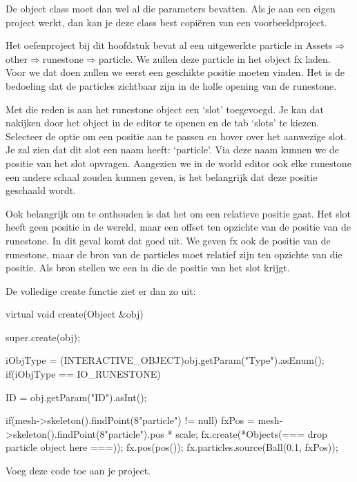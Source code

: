 \begin{note}
De object class  moet dan wel al die parameters bevatten. Als je aan een eigen project werkt, dan kan je deze class best copi\"eren van een voorbeeldproject. 
\end{note}

Het oefenproject bij dit hoofdstuk bevat al een uitgewerkte particle in Assets$\Rightarrow$other$\Rightarrow$runestone$\Rightarrow$particle. We zullen deze particle in het object fx laden. Voor we dat doen zullen we eerst een geschikte positie moeten vinden. Het is de bedoeling dat de particles zichtbaar zijn in de holle opening van de runestone. 

Met die reden is aan het runestone object een `slot' toegevoegd. Je kan dat nakijken door het object in de editor te openen en de tab `slots' te kiezen. Selecteer de optie om een positie aan te passen en hover over het aanwezige slot. Je zal zien dat dit slot een naam heeft: `particle'. Via deze naam kunnen we de positie van het slot opvragen. Aangezien we in de world editor ook elke runestone een andere schaal zouden kunnen geven, is het belangrijk dat deze positie geschaald wordt.

Ook belangrijk om te onthouden is dat het om een relatieve positie gaat. Het slot heeft geen positie in de wereld, maar een offset ten opzichte van de positie van de runestone. In dit geval komt dat goed uit. We geven fx ook de positie van de runestone, maar de bron van de particles moet relatief zijn ten opzichte van die positie. Als bron stellen we een  in die de positie van het slot krijgt.

De volledige create functie ziet er dan zo uit:
\begin{code}
virtual void create(Object &obj)
{
  super.create(obj);
  
  iObjType = (INTERACTIVE_OBJECT)obj.getParam("Type").asEnum(); 
  if(iObjType == IO_RUNESTONE)
  {
     ID = obj.getParam("ID").asInt();
     
     if(mesh->skeleton().findPoint(8"particle") != null)
     {
        fxPos = mesh->skeleton().findPoint(8"particle").pos * scale;
        fx.create(*Objects(=== drop particle object here ===));
        fx.pos(pos());
        fx.particles.source(Ball(0.1, fxPos));
     } 
  }
}
\end{code}

\begin{exercise}
Voeg deze code toe aan je project.
\end{exercise}

